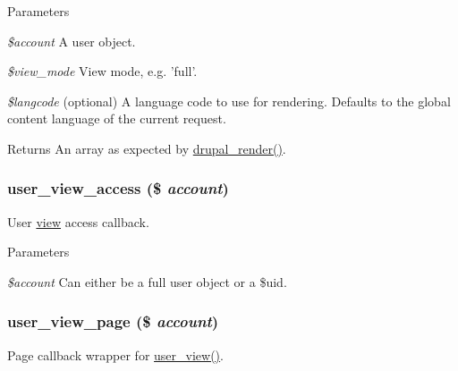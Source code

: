 \begin{DoxyParams}{Parameters}
\item[{\em \$account}]A user object. \item[{\em \$view\_\-mode}]View mode, e.g. 'full'. \item[{\em \$langcode}](optional) A language code to use for rendering. Defaults to the global content language of the current request.\end{DoxyParams}
\begin{DoxyReturn}{Returns}
An array as expected by \hyperlink{common_8inc_a05798b44e8d6c496d4bee5cc32fa7851}{drupal\_\-render()}. 
\end{DoxyReturn}
\hypertarget{user_8module_a49c65cc4c7b0512c787fb8e822d7dd4d}{
\subsubsection[{user\_\-view\_\-access}]{\setlength{\rightskip}{0pt plus 5cm}user\_\-view\_\-access (\$ {\em account})}}
\label{user_8module_a49c65cc4c7b0512c787fb8e822d7dd4d}
User \hyperlink{classview}{view} access callback.


\begin{DoxyParams}{Parameters}
\item[{\em \$account}]Can either be a full user object or a \$uid. \end{DoxyParams}
\hypertarget{user_8module_a93954fceea22b31ffafb20cd45d81c94}{
\subsubsection[{user\_\-view\_\-page}]{\setlength{\rightskip}{0pt plus 5cm}user\_\-view\_\-page (\$ {\em account})}}
\label{user_8module_a93954fceea22b31ffafb20cd45d81c94}
Page callback wrapper for \hyperlink{user_8module_aa5b236a0e9e2aad7ff06f23bc5046914}{user\_\-view()}. 